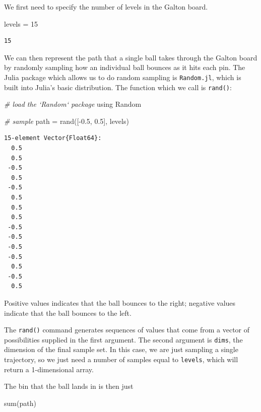 \documentclass[
  11pt,
]{book}
\newenvironment{Shaded}{\begin{snugshade}}{\end{snugshade}}
\newcommand{\CommentTok}[1]{\textcolor[rgb]{0.37,0.37,0.37}{\textit{#1}}}
\newcommand{\FloatTok}[1]{\textcolor[rgb]{0.06,0.06,0.06}{#1}}
\newcommand{\NormalTok}[1]{#1}
\begin{document}
We first need to specify the number of levels in the Galton board.

\begin{Shaded}
\begin{Highlighting}[]
\NormalTok{levels = }\FloatTok{15}
\end{Highlighting}
\end{Shaded}

\begin{verbatim}
15
\end{verbatim}

We can then represent the path that a single ball takes through the Galton board by randomly sampling how an individual ball bounces as it hits each pin. The Julia package which allows us to do random sampling is \texttt{Random.jl}, which is built into Julia's basic distribution. The function which we call is \texttt{rand()}:

\begin{Shaded}
\begin{Highlighting}[]
\CommentTok{# load the `Random` package}
\NormalTok{using Random}

\CommentTok{# sample}
\NormalTok{path = rand([-}\FloatTok{0.5}\NormalTok{, }\FloatTok{0.5}\NormalTok{], levels)}
\end{Highlighting}
\end{Shaded}

\begin{verbatim}
15-element Vector{Float64}:
  0.5
  0.5
 -0.5
  0.5
 -0.5
  0.5
  0.5
  0.5
 -0.5
 -0.5
 -0.5
 -0.5
  0.5
 -0.5
  0.5
\end{verbatim}

Positive values indicates that the ball bounces to the right; negative values indicate that the ball bounces to the left.

The \texttt{rand()} command generates sequences of values that come from a vector of possibilities supplied in the first argument. The second argument is \texttt{dims}, the dimension of the final sample set. In this case, we are just sampling a single trajectory, so we just need a number of samples equal to \texttt{levels}, which will return a 1-dimensional array.

The bin that the ball lands in is then just

\begin{Shaded}
\begin{Highlighting}[]
\NormalTok{sum(path)}
\end{Highlighting}
\end{Shaded}
\end{document}
